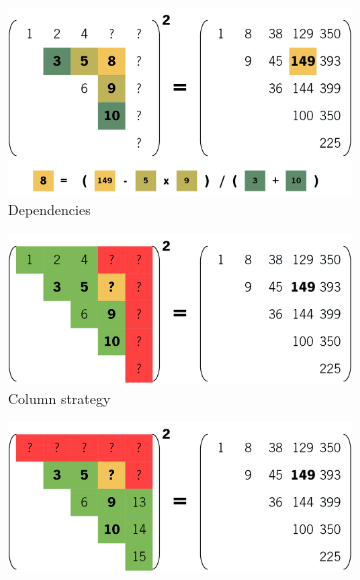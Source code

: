 \documentclass[../thesis]{subfiles}
\begin{document}
	\begin{figure}[htp]
		\addtolength\belowcaptionskip{1cm}
		\begin{subfigure}{\textwidth}
			\centering
			\includegraphics[height=0.2\textheight]{assets/images/case/dependencies.png}
			\caption{Dependencies}
		\end{subfigure}
		\begin{subfigure}{\textwidth}
			\centering
			\includegraphics[height=0.16\textheight]{assets/images/case/column.png}
			\caption{Column strategy}
		\end{subfigure}
		\begin{subfigure}{\textwidth}
			\centering
			\includegraphics[height=0.16\textheight]{assets/images/case/row.png}

\end{subfigure}
\end{figure}
\end{document}
